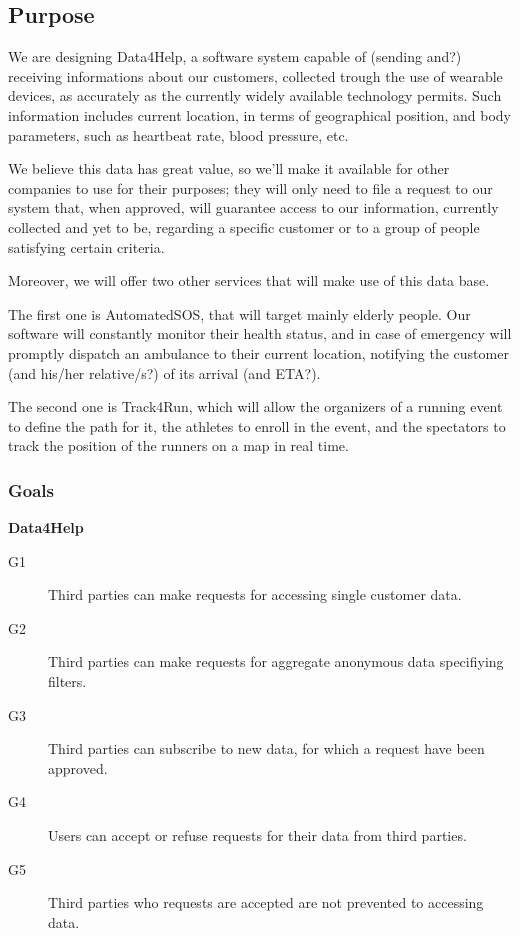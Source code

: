 \documentclass[../main.tex]{subfiles}
\begin{document}
\subsection{Purpose}

We are designing Data4Help, a software system capable of (sending and?) receiving informations about our customers, collected trough the use of wearable devices, as accurately as the currently widely available technology permits.
Such information includes current location, in terms of geographical position, and body parameters, such as heartbeat rate, blood pressure, etc.

We believe this data has great value, so we'll make it available for other companies to use for their purposes; they will only need to file a request to our system that, when approved, will guarantee access to our information, currently collected and yet to be, regarding a specific customer or to a group of people satisfying certain criteria.

Moreover, we will offer two other services that will make use of this data base.

The first one is AutomatedSOS, that will target mainly elderly people. Our software will constantly monitor their health status, and in case of emergency will promptly dispatch an ambulance to their current location, notifying the customer (and his/her relative/s?) of its arrival (and ETA?).

The second one is Track4Run, which will allow the organizers of a running event to define the path for it, the athletes to enroll in the event, and the spectators to track the position of the runners on a map in real time.


\subsubsection{Goals}


{\bf Data4Help}
\begin{description}
	\item [G1]  Third parties can make requests for accessing single customer data.
	\item [G2]  Third parties can make requests for aggregate anonymous data specifiying filters.
	\item [G3]	Third parties can subscribe to new data, for which a request have been approved.
	\item [G4]  Users can accept or refuse requests for their data from third parties.
	\item [G5]  Third parties who requests are accepted are not prevented to accessing data.
\end{description}
\end{document}
